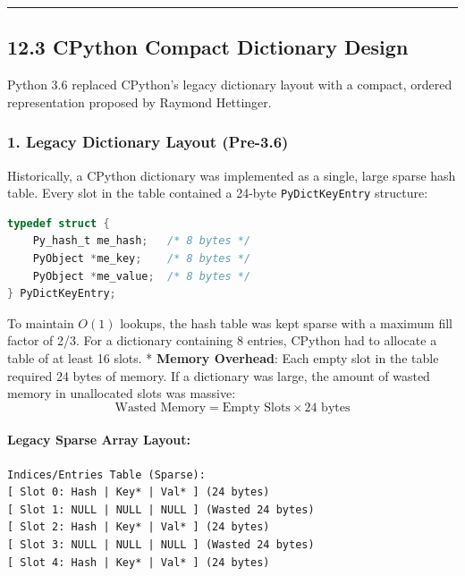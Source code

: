 \begin{center}\rule{0.5\linewidth}{0.5pt}\end{center}

\hypertarget{cpython-compact-dictionary-design}{%
\subsection{12.3 CPython Compact Dictionary
Design}\label{cpython-compact-dictionary-design}}

Python 3.6 replaced CPython's legacy dictionary layout with a compact,
ordered representation proposed by Raymond Hettinger.

\hypertarget{legacy-dictionary-layout-pre-3.6}{%
\subsubsection{1. Legacy Dictionary Layout
(Pre-3.6)}\label{legacy-dictionary-layout-pre-3.6}}

Historically, a CPython dictionary was implemented as a single, large
sparse hash table. Every slot in the table contained a 24-byte
\passthrough{\lstinline!PyDictKeyEntry!} structure:

\begin{lstlisting}[language=C]
typedef struct {
    Py_hash_t me_hash;   /* 8 bytes */
    PyObject *me_key;    /* 8 bytes */
    PyObject *me_value;  /* 8 bytes */
} PyDictKeyEntry;
\end{lstlisting}

To maintain \(O(1)\) lookups, the hash table was kept sparse with a
maximum fill factor of 2/3. For a dictionary containing 8 entries,
CPython had to allocate a table of at least 16 slots. * \textbf{Memory
Overhead}: Each empty slot in the table required 24 bytes of memory. If
a dictionary was large, the amount of wasted memory in unallocated slots
was massive:
\[\text{Wasted Memory} = \text{Empty Slots} \times 24 \text{ bytes}\]

\hypertarget{legacy-sparse-array-layout}{%
\paragraph{Legacy Sparse Array
Layout:}\label{legacy-sparse-array-layout}}

\begin{lstlisting}
Indices/Entries Table (Sparse):
[ Slot 0: Hash | Key* | Val* ] (24 bytes)
[ Slot 1: NULL | NULL | NULL ] (Wasted 24 bytes)
[ Slot 2: Hash | Key* | Val* ] (24 bytes)
[ Slot 3: NULL | NULL | NULL ] (Wasted 24 bytes)
[ Slot 4: Hash | Key* | Val* ] (24 bytes)
\end{lstlisting}

